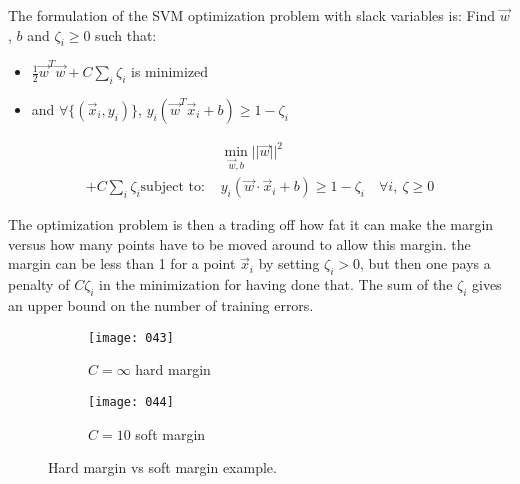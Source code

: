 The formulation of the SVM optimization problem with slack variables is: Find \(\vec{w}\), \(b\) and \(\zeta_i \geq 0\) such that:
\begin{itemize}
    \item
    \(\frac 1 2 \vec{w}^T \vec{w} + C \sum_i \zeta_i\) is minimized
    \item
    and \(\forall \{(\vec{x}_i, y_i)\}\), \(y_i(\vec{w}^T \vec{x}_i + b) \geq 1 - \zeta_i\)
\end{itemize}
\begin{align*}
    &\min_{\vec{w},b} ||\vec{w}||^2\\ + C \sum_i \zeta_i
    \text{subject to: } &y_i(\vec{w} \cdot \vec{x}_i + b) \geq 1 - \zeta_i \quad \forall i,\ \zeta \geq 0
\end{align*}

The optimization problem is then a trading off how fat it can make the margin versus how many points have to be moved around to allow this margin. the margin can be less than 1 for a point \(\vec{x}_i\) by setting \(\zeta_i > 0\), but then one pays a penalty of \(C\zeta_i\) in the minimization for having done that. The sum of the \(\zeta_i\) gives an upper bound on the number of training errors.

\begin{figure}[h!]
    \centering
    \begin{subfigure}{.4\textwidth}
        \centering
        \texttt{[image: 043]}
        \caption{\(C = \infty\) hard margin}
    \end{subfigure}
    \begin{subfigure}{.4\textwidth}
        \centering
        \texttt{[image: 044]}
        \caption{\(C=10\) soft margin}
    \end{subfigure}
    \caption{Hard margin vs soft margin example.}
\end{figure}

